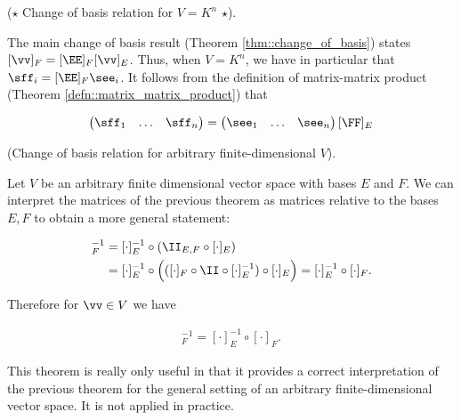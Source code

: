 \begin{theorem}
\label{thm::change_of_basis_Kn}
    ($\star$ Change of basis relation for $V = K^n$ $\star$). 
    
    The main change of basis result (Theorem \ref{thm::change_of_basis}) states $[\vv]_F = [\EE]_F [\vv]_E$. Thus, when $V = K^n$, we have in particular that $\sff_i = [\EE]_F \see_i$. It follows from the definition of matrix-matrix product (Theorem \ref{defn::matrix_matrix_product}) that

    \begin{align*}
        \begin{pmatrix} \sff_1 & \hdots & \sff_n \end{pmatrix} 
        =
        \begin{pmatrix} \see_1 & \hdots & \see_n \end{pmatrix} [\FF]_E    
    \end{align*}
\end{theorem}

\begin{theorem}
\label{thm::change_of_basis_arb}
    (Change of basis relation for arbitrary finite-dimensional $V$). 
    
    Let $V$ be an arbitrary finite dimensional vector space with bases $E$ and $F$. We can interpret the matrices of the previous theorem as matrices relative to the bases $E, F$ to obtain a more general statement:
    
    \begin{align*}
        [\cdot]_F^{-1} &= [\cdot]_E^{-1} \circ (\II_{E,F} \circ [\cdot]_E) \\
        &= [\cdot]_E^{-1} \circ \Big( ([\cdot]_F \circ \II \circ [\cdot]_E^{-1}) \circ [\cdot]_E \Big)
        = [\cdot]_E^{-1} \circ [\cdot]_F.
    \end{align*}
    
    Therefore for $\vv \in V$ we have
    
    \begin{align*}
        [\cdot]_F^{-1} = [\cdot]_E^{-1} \circ [\cdot]_F.
    \end{align*}
    
    This theorem is really only useful in that it provides a correct interpretation of the previous theorem for the general setting of an arbitrary finite-dimensional vector space. It is not applied in practice.
\end{theorem}

